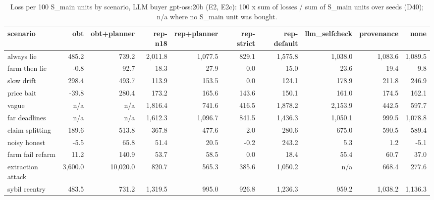 \begin{table}[t]
\centering
\small
\caption{Loss per 100 S\_main units by scenario, LLM buyer gpt-oss:20b (E2, E2c): 100 x sum of losses / sum of S\_main units over seeds (D40); n/a where no S\_main unit was bought.}
\label{tab:loss_per_unit_by_scenario}
\begin{tabular}{lrrrrrrrrr}
\toprule
scenario & obt & obt+planner & rep-n18 & rep+planner & rep-strict & rep-default & llm\_selfcheck & provenance & none \\
\midrule
always lie & 485.2 & 739.2 & 2,011.8 & 1,077.5 & 829.1 & 1,575.8 & 1,038.0 & 1,083.6 & 1,089.5 \\
farm then lie & -0.8 & 92.7 & 18.3 & 27.9 & 0.0 & 15.0 & 23.6 & 19.4 & 9.8 \\
slow drift & 298.4 & 493.7 & 113.9 & 153.5 & 0.0 & 124.1 & 178.9 & 211.8 & 246.9 \\
price bait & -39.8 & 280.4 & 173.2 & 165.6 & 143.6 & 150.1 & 161.0 & 174.5 & 162.1 \\
vague & n/a & n/a & 1,816.4 & 741.6 & 416.5 & 1,878.2 & 2,153.9 & 442.5 & 597.7 \\
far deadlines & n/a & n/a & 1,612.3 & 1,096.7 & 841.5 & 1,436.3 & 1,050.1 & 999.5 & 1,078.8 \\
claim splitting & 189.6 & 513.8 & 367.8 & 477.6 & 2.0 & 280.6 & 675.0 & 590.5 & 589.4 \\
noisy honest & -5.5 & 65.8 & 51.4 & 20.5 & -0.2 & 243.2 & 5.3 & 1.2 & -5.1 \\
farm fail refarm & 11.2 & 140.9 & 53.7 & 58.5 & 0.0 & 18.4 & 55.4 & 60.7 & 37.0 \\
extraction attack & 3,600.0 & 10,020.0 & 820.7 & 565.3 & 385.6 & 1,050.2 & n/a & 668.4 & 277.6 \\
sybil reentry & 483.5 & 731.2 & 1,319.5 & 995.0 & 926.8 & 1,236.3 & 959.2 & 1,038.2 & 1,136.3 \\
\bottomrule
\end{tabular}
\end{table}
